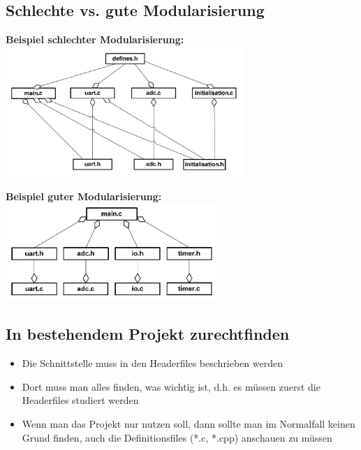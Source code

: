 \subsection{Schlechte vs. gute Modularisierung}
\begin{minipage}[t]{10cm}
\textbf{Beispiel schlechter Modularisierung:}\\
\includegraphics[width=9cm]{images/Modularisierung/SchlechtesBeispielModularisierung.png}
\end{minipage}
\begin{minipage}[t]{8cm}
\textbf{Beispiel guter Modularisierung:}\\
\includegraphics[width=8cm]{images/Modularisierung/GutesBeispielModularisierung.png}
\end{minipage}

\subsection{In bestehendem Projekt zurechtfinden}
\begin{itemize}
	\item Die Schnittstelle muss in den Headerfiles beschrieben werden
	\item Dort muss man alles finden, was wichtig ist, d.h. es müssen zuerst die Headerfiles studiert werden
	\item Wenn man das Projekt nur nutzen soll, dann sollte man im Normalfall keinen Grund finden, auch die Definitionsfiles (*.c, *.cpp) anschauen zu müssen
\end{itemize}

